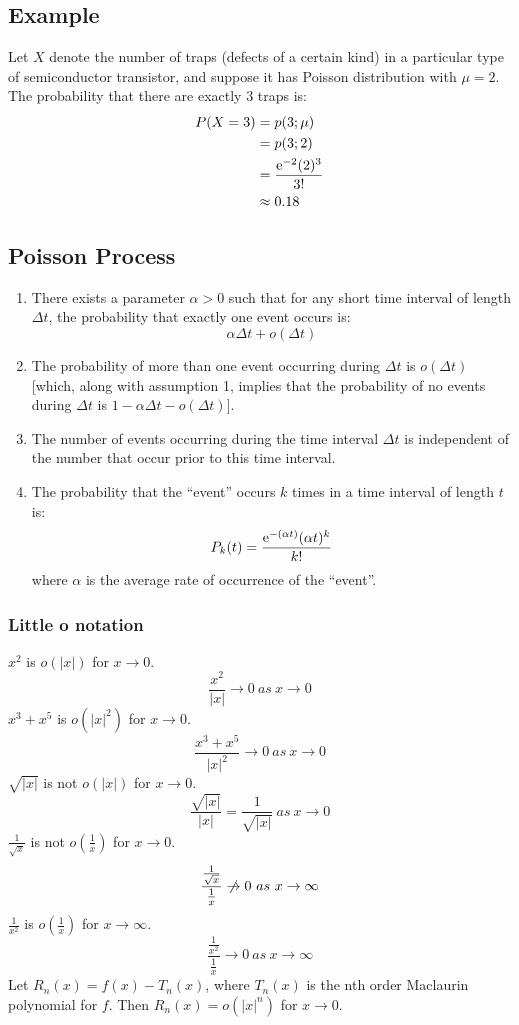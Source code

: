 \documentclass{math}
\begin{document}
\subsection*{Example}
Let \( X \) denote the number of traps (defects of a certain kind) in a
particular type of semiconductor transistor, and suppose it has Poisson
distribution with \( \mu = 2 \). The probability that there are exactly
3 traps is:
\begin{align*}
  P(X=3) &= p(3;\mu) \\
  &= p(3;2) \\
  &= \frac{\mathrm{e}^{-2}(2)^{3}}{3!} \\
  &\approx 0.18
\end{align*}

\subsection*{Poisson Process}
\begin{enumerate}
  \item There exists a parameter \( \alpha > 0 \) such that for any short time
    interval of length \( \Delta t \), the probability that exactly one
    event occurs is:
    \[ \alpha\Delta t+o(\Delta t) \]
  \item The probability of more than one event occurring during \( \Delta t \)
    is \( o(\Delta t) \) [which, along with assumption 1, implies that
    the probability of no events during \( \Delta t \) is
    \( 1-\alpha\Delta t-o(\Delta t) \)].
  \item The number of events occurring during the time interval \( \Delta t \)
    is independent of the number that occur prior to this time interval.
  \item The probability that the ``event'' occurs \( k \) times in a time
    interval of length \( t \) is:
    \[ P_{k}(t) = \frac{\mathrm{e}^{-(\alpha t)}(\alpha t)^{k}}{k!} \]
    where \( \alpha \) is the average rate of occurrence of the ``event''.
\end{enumerate}

\subsubsection*{Little o notation}
\( x^{2} \) is \( o(|x|) \) for \( x\to 0 \).
\[ \frac{x^{2}}{|x|} \to 0\ as\ x\to 0 \]
\( x^{3}+x^{5} \) is \( o(|x|^{2}) \) for \( x\to 0 \).
\[ \frac{x^{3}+x^{5}}{|x|^{2}} \to 0\ as\ x\to 0 \]
\( \sqrt{|x|} \) is not \( o(|x|) \) for \( x\to 0 \).
\[ \frac{\sqrt{|x|}}{|x|} = \frac{1}{\sqrt{|x|}}\ as\ x\to 0 \]
\( \frac{1}{\sqrt{x}} \) is not \( o(\frac{1}{x}) \) for \( x\to 0 \).
\[ \frac{\frac{1}{\sqrt{x}}}{\frac{1}{x}} \centernot\to 0\ as\ x\to\infty \]
\( \frac{1}{x^{2}} \) is \( o(\frac{1}{x}) \) for \( x\to\infty \).
\[ \frac{\frac{1}{x^{2}}}{\frac{1}{x}} \to 0\ as\ x\to\infty \]
Let \( R_{n}(x) = f(x)-T_{n}(x) \), where \( T_{n}(x) \) is the nth order
Maclaurin polynomial for \( f \). Then \( R_{n}(x) = o(|x|^{n}) \) for
\( x\to 0 \).
\end{document}
